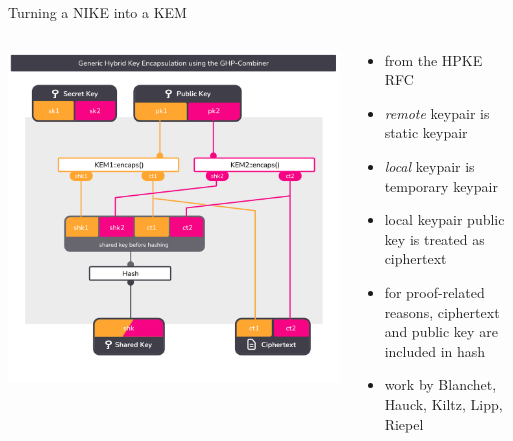 \begin{frame}{Turning a NIKE into a KEM}
  \begin{columns}[c]
    \begin{column}{.55\linewidth}
    \includegraphics[width=\linewidth,page=2,clip=true,trim={29 43  29 58}]{graphics/rosenpass-encapsulation-combiner.pdf}
    \end{column}%
    \begin{column}{.45\linewidth}
      \small
      \begin{itemize}
        \item from the HPKE RFC \citeHpke
        \item \emph{remote} keypair is static keypair
        \item \emph{local} keypair is temporary keypair
        \item local keypair public key is treated as ciphertext
        \item for proof-related reasons, ciphertext and public key
          are included in hash
        \item work by Blanchet, Hauck, Kiltz, Lipp, Riepel
      \end{itemize}
    \end{column}
  \end{columns}
\end{frame}

